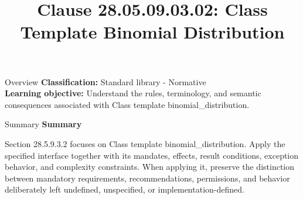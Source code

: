 \documentclass[10pt,letterpaper]{article}
\title{Clause 28.05.09.03.02: Class Template Binomial Distribution}
\author{}
\date{}
\begin{document}
\maketitle
\begin{CornellOverviewBox}{Overview}
\textbf{Classification:} Standard library - Normative\\[2pt]
\textbf{Learning objective:} Understand the rules, terminology, and semantic consequences associated with Class template binomial\_distribution.
\end{CornellOverviewBox}\begin{CornellSummaryBox}{Summary}
{\sffamily\bfseries\color{Accent} Summary}\par\vspace{3pt}Section 28.5.9.3.2 focuses on Class template binomial\_distribution. Apply the specified interface together with its mandates, effects, result conditions, exception behavior, and complexity constraints. When applying it, preserve the distinction between mandatory requirements, recommendations, permissions, and behavior deliberately left undefined, unspecified, or implementation-defined.
\end{CornellSummaryBox}
\end{document}
